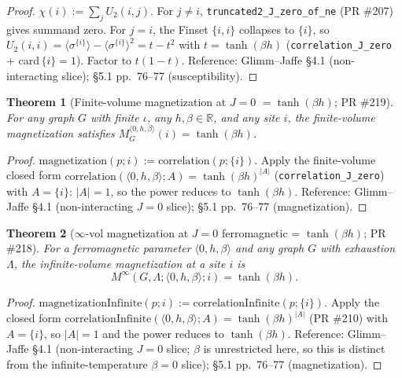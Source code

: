 \documentclass[a4paper,11pt]{article}
\newtheorem{theorem}{Theorem}
\begin{document}
\begin{proof}
$\chi(i) := \sum_j U_2(i,j)$. For $j \neq i$,
\texttt{truncated2\_J\_zero\_of\_ne} (PR \#207) gives summand zero.
For $j = i$, the Finset $\{i,i\}$ collapses to $\{i\}$, so
$U_2(i,i) = \langle \sigma^{\{i\}}\rangle -
\langle \sigma^{\{i\}}\rangle^2 = t - t^2$ with $t = \tanh(\beta h)$
(\texttt{correlation\_J\_zero} + card$\,\{i\}=1$). Factor to
$t(1-t)$. Reference: Glimm--Jaffe \cite{glimm-jaffe} \S 4.1
(non-interacting slice); \S 5.1 pp.~76--77 (susceptibility).
\end{proof}

\begin{theorem}[Finite-volume magnetization at $J = 0$
$= \tanh(\beta h)$; PR \#219]
For any graph $G$ with finite $\iota$, any $h, \beta \in \mathbb{R}$,
and any site $i$, the finite-volume magnetization satisfies
$M^{\langle 0, h, \beta\rangle}_G(i) = \tanh(\beta h)$.
\end{theorem}

\begin{proof}
$\mathrm{magnetization}(p; i) := \mathrm{correlation}(p; \{i\})$.
Apply the finite-volume closed form
$\mathrm{correlation}(\langle 0, h, \beta\rangle; A)
= \tanh(\beta h)^{|A|}$ (\texttt{correlation\_J\_zero}) with
$A = \{i\}$: $|A| = 1$, so the power reduces to
$\tanh(\beta h)$.
Reference: Glimm--Jaffe \cite{glimm-jaffe} \S 4.1
(non-interacting $J = 0$ slice); \S 5.1 pp.~76--77
(magnetization).
\end{proof}

\begin{theorem}[$\infty$-vol magnetization at $J = 0$
ferromagnetic = $\tanh(\beta h)$; PR \#218]
For a ferromagnetic parameter $\langle 0, h, \beta \rangle$ and
any graph $G$ with exhaustion $\Lambda$, the infinite-volume
magnetization at a site $i$ is
\[
  M^\infty(G, \Lambda; \langle 0, h, \beta\rangle; i)
  = \tanh(\beta h).
\]
\end{theorem}

\begin{proof}
$\mathrm{magnetizationInfinite}(p; i) :=
\mathrm{correlationInfinite}(p; \{i\})$. Apply the closed form
$\mathrm{correlationInfinite}(\langle 0, h, \beta\rangle; A) =
\tanh(\beta h)^{|A|}$ (PR \#210) with $A = \{i\}$, so
$|A| = 1$ and the power reduces to $\tanh(\beta h)$.
Reference: Glimm--Jaffe \cite{glimm-jaffe} \S 4.1
(non-interacting $J = 0$ slice; $\beta$ is unrestricted here, so
this is distinct from the infinite-temperature $\beta = 0$
slice); \S 5.1 pp.~76--77 (magnetization).
\end{proof}
\end{document}
